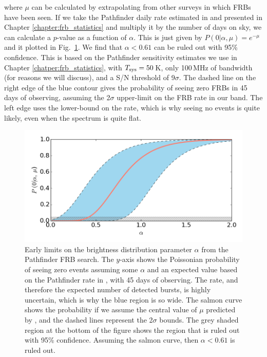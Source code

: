 \noindent where $\mu$ can be calculated by extrapolating 
from other surveys in which FRBs have been seen.  
If we take the Pathfinder daily rate estimated in 
\citep{2016MNRAS.460.1054C} and presented in 
Chapter \ref{chapter:frb_statistics} and multiply it by 
the number of days on sky, we can calculate a $p$-value
as a function of $\alpha$. This is just given by 
$P(0 | \alpha, \mu) = e^{-\mu}$ and it plotted in 
Fig.~\ref{fig-pf_alpha}. We find that $\alpha < 0.61$
can be ruled out with 95\% confidence. This is 
based on the Pathfinder sensitivity estimates we use in Chapter 
\ref{chatper:frb_statistics}, with $T_{\rm sys}=50$\,K,
only 100\,MHz of bandwidth (for reasons we will 
discuss), and a S/N threshold of 9$\sigma$. The 
dashed line on the right edge of the blue 
contour gives the probability of seeing 
zero FRBs in 45 days of observing, assuming the 
2$\sigma$ upper-limit on the FRB rate in our band. The 
left edge uses the lower-bound on the rate, which is why 
seeing no events is quite likely, even when the 
spectrum is quite flat.



\begin{figure}[!h]
\begin{center}
\includegraphics[trim={0in 0in 0in 0in}, scale=0.65]
{./figures/beamforming/alpha_limits.png}
\vspace{-.4cm}
\caption[abc]{Early limits on the brightness distribution 
     parameter $\alpha$ from the Pathfinder 
     FRB search. The $y$-axis shows the Poissonian 
     probability of seeing zero events assuming 
     some $\alpha$ and an expected value based on the 
     Pathfinder rate in \citep{2016MNRAS.460.1054C}, 
     with 45 days of observing. The rate, and therefore the 
     expected number of detected bursts, is highly uncertain,
     which is why the blue region is so wide.
     The salmon curve shows the probability if we assume the 
     central value of $\mu$ predicted by \citet{2016MNRAS.460.1054C}, 
     and the dashed lines represent 
     the 2$\sigma$ bounds. The grey shaded region at the bottom 
     of the figure shows the region that is ruled out 
     with 95\% confidence. Assuming the salmon curve, 
     then $\alpha < 0.61$ is ruled out.}
\label{fig-pf_alpha}
\end{center}
\end{figure}


